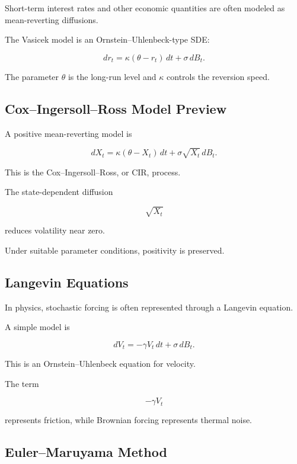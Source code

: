 Short-term interest rates and other economic quantities are often
modeled as mean-reverting diffusions.

The Vasicek model is an Ornstein--Uhlenbeck-type SDE:

\[
\boxed{
dr_t
=
\kappa(\theta-r_t)\,dt
+
\sigma\,dB_t.
}
\]

The parameter \(\theta\) is the long-run level and \(\kappa\) controls
the reversion speed.

\subsection{Cox--Ingersoll--Ross Model Preview}
\label{subsec:cir-preview}

A positive mean-reverting model is

\[
\boxed{
dX_t
=
\kappa(\theta-X_t)\,dt
+
\sigma\sqrt{X_t}\,dB_t.
}
\]

This is the Cox--Ingersoll--Ross, or CIR, process.

The state-dependent diffusion

\[
\sqrt{X_t}
\]

reduces volatility near zero.

Under suitable parameter conditions, positivity is preserved.

\subsection{Langevin Equations}
\label{subsec:langevin-equations}

In physics, stochastic forcing is often represented through a Langevin
equation.

A simple model is

\[
\boxed{
dV_t
=
-\gamma V_t\,dt
+
\sigma\,dB_t.
}
\]

This is an Ornstein--Uhlenbeck equation for velocity.

The term

\[
-\gamma V_t
\]

represents friction, while Brownian forcing represents thermal noise.

\subsection{Euler--Maruyama Method}
\label{subsec:euler-maruyama}

